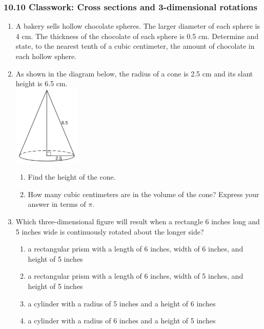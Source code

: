 \documentclass[12pt, twoside]{article}
\begin{document}
\subsubsection*{10.10 Classwork: Cross sections and 3-dimensional rotations}
 \begin{enumerate}

   \item A bakery sells hollow chocolate spheres. The larger diameter of each sphere is 4 cm. The thickness of the chocolate of each sphere is 0.5 cm. Determine and state, to the nearest tenth of a cubic centimeter, the amount of chocolate in each hollow sphere.\\[0.5cm]


   \item As shown in the diagram below, the radius of a cone is 2.5 cm and its slant height is 6.5 cm.\\[0.5cm]
     \includegraphics[width=0.25\textwidth]{cone_Jan2019-23.png}
     \begin{enumerate}
       \item Find the height of the cone. \vspace{2cm}
       \item How many cubic centimeters are in the volume of the cone? Express your answer in terms of $\pi$.
   \end{enumerate} \vspace{2.5cm}

\newpage
  \item Which three-dimensional figure will result when a rectangle 6 inches long and 5 inches wide is continuously rotated about the longer side?
    \begin{enumerate}
      \item a rectangular prism with a length of 6 inches, width of 6 inches, and height of 5 inches
      \item a rectangular prism with a length of 6 inches, width of 5 inches, and height of 5 inches
      \item a cylinder with a radius of 5 inches and a height of 6 inches
      \item a cylinder with a radius of 6 inches and a height of 5 inches
    \end{enumerate}


\end{enumerate}
\end{document}
